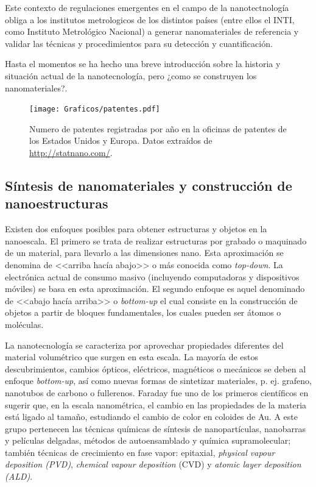  	 Este contexto de regulaciones emergentes en el campo de la nanotectnología obliga a los institutos metrologicos de los distintos países (entre ellos el INTI, como Instituto Metrológico Nacional) a generar nanomateriales de referencia y validar las técnicas y procedimientos para su detección y cuantificación.

 	 Hasta el momentos se ha hecho una breve introducción sobre la historia y situación actual de la nanotecnología, pero ¿como se construyen los nanomateriales?.


		\begin{figure}[h!]
 			\begin{center}
 			\texttt{[image: Graficos/patentes.pdf]}
 			\vspace*{-0.3cm}
 			\caption[Número de patentes de productos en base nanotecnológica]{Numero de patentes registradas por año en la oficinas de patentes de los Estados Unidos y Europa. Datos extraídos de \url{http://statnano.com/}.}
 			\label{fig:patentes}
 		    \end{center}
 		    \end{figure}

 	\vspace*{-0.6cm}\subsection{Síntesis de nanomateriales y construcción de nanoestructuras}

		Existen dos enfoques posibles para obtener estructuras y objetos en la nanoescala. El primero se trata de realizar estructuras por grabado o maquinado de un material, para llevarlo a las dimensiones nano. Esta aproximación se denomina de <<arriba hacía abajo>> o más conocida como \textit{top-down}. La electrónica actual de consumo masivo (incluyendo computadoras y dispositivos móviles) se basa en esta aproximación. El segundo enfoque es aquel denominado de <<abajo hacía arriba>> o \textit{bottom-up} el cual consiste en la construcción de objetos a partir de bloques fundamentales, los cuales pueden ser átomos o moléculas. 

		La nanotecnología se caracteriza por aprovechar propiedades diferentes del material volumétrico que surgen en esta escala. La mayoría de estos descubrimientos, cambios ópticos, eléctricos, magnéticos o mecánicos se deben al enfoque \textit{bottom-up}, así como nuevas formas de sintetizar materiales, p. ej. grafeno, nanotubos de carbono o fullerenos. Faraday fue uno de los primeros científicos en sugerir que, en la escala nanométrica, el cambio en las propiedades de la materia está ligado al tamaño, estudiando el cambio de color en coloides de Au\cite{faraday1857}. A este grupo pertenecen las técnicas químicas de síntesis de nanopartículas, nanobarras y películas delgadas, métodos de autoensamblado y química supramolecular; también técnicas de crecimiento en fase vapor: epitaxial, \textit{physical vapour deposition (PVD)}, \textit{chemical vapour deposition} (CVD) y \textit{atomic layer deposition (ALD)}.
			
